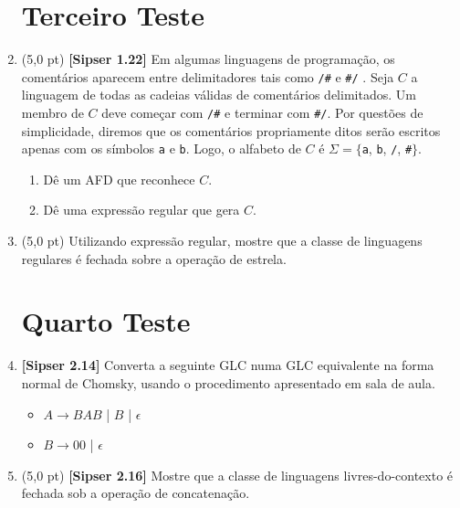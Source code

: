 \documentclass[12pt,a4paper,oneside]{article}
\begin{document}
\begin{enumerate}
	
	\section*{Terceiro Teste}
	
	\item (5,0 pt) {\bf [Sipser 1.22]} Em algumas linguagens de programação, os comentários aparecem entre delimitadores tais como {\tt /\#} e {\tt \#/} . Seja $C$ a linguagem de todas as cadeias válidas de comentários delimitados. Um membro de $C$ deve começar com {\tt /\#} e terminar com {\tt \#/}. Por questões de simplicidade, diremos que os comentários propriamente ditos serão escritos apenas com os símbolos {\tt a} e {\tt b}. Logo, o alfabeto de $C$ é $\Sigma = \{${\tt a}, {\tt b}, {\tt /}, {\tt \#}$\}$. 
	\begin{enumerate}
		\item Dê um AFD que reconhece $C$.
		\item Dê uma expressão regular que gera $C$.
	\end{enumerate}
	
	\item (5,0 pt) Utilizando expressão regular, mostre que a classe de linguagens regulares é fechada sobre a operação de estrela.
	
	\section*{Quarto Teste}
	
	\item {\bf [Sipser 2.14]}  Converta a seguinte GLC numa GLC equivalente na forma normal de Chomsky,
	usando o procedimento apresentado em sala de aula.
	\begin{itemize}
		\item[] $A \rightarrow BAB$ | $B$ | $\epsilon$
		\item[] $B \rightarrow 00$ | $\epsilon$
	\end{itemize}
	
	\item (5,0 pt) {\bf [Sipser 2.16]}  Mostre que a classe de linguagens livres-do-contexto é fechada sob a operação de concatenação.

\end{enumerate}
\end{document}
